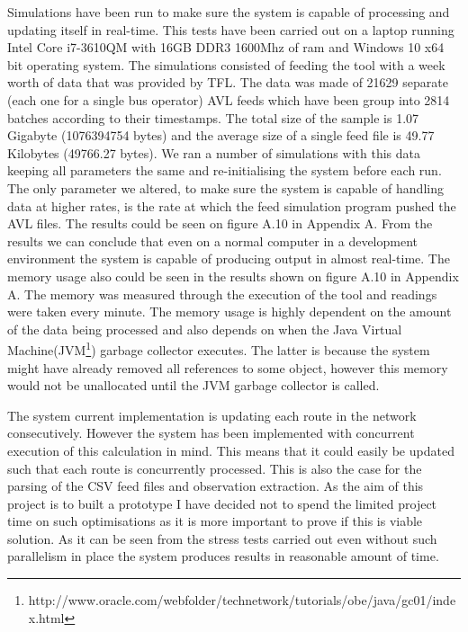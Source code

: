 Simulations have been run to make sure the system is capable of processing and updating itself in real-time. This tests have been carried out on a laptop running Intel Core i7-3610QM with 16GB DDR3 1600Mhz of ram and Windows 10 x64 bit operating system. The simulations consisted of feeding the tool with a week worth of data that was provided by TFL. The data was made of 21629 separate (each one for a single bus operator) AVL feeds which have been group into 2814 batches according to their timestamps. The total size of the sample is 1.07 Gigabyte (1076394754 bytes) and the average size of a single feed file is 49.77 Kilobytes (49766.27 bytes). We ran a number of simulations with this data keeping all parameters the same and re-initialising the system before each run. The only parameter we altered, to make sure the system is capable of handling data at higher rates, is the rate at which the feed simulation program pushed the AVL files. The results could be seen on figure A.10 in Appendix A. From the results we can conclude that even on a normal computer in a development environment the system is capable of producing output in almost real-time. The memory usage also could be seen in the results shown on figure A.10 in Appendix A. The memory was measured through the execution of the tool and readings were taken every minute. The memory usage is highly dependent on the amount of the data being processed and also depends on when the Java Virtual Machine(JVM\footnote{http://www.oracle.com/webfolder/technetwork/tutorials/obe/java/gc01/index.html}) garbage collector executes. The latter is because the system might have already removed all references to some object, however this memory would not be unallocated until the JVM garbage collector is called.

The system current implementation is updating each route in the network consecutively. However the system has been implemented with concurrent execution of this calculation in mind. This means that it could easily be updated such that each route is concurrently processed. This is also the case for the parsing of the CSV feed files and observation extraction. As the aim of this project is to built a prototype I have decided not to spend the limited project time on such optimisations as it is more important to prove if this is viable solution. As it can be seen from the stress tests carried out even without such parallelism in place the system produces results in reasonable amount of time.

